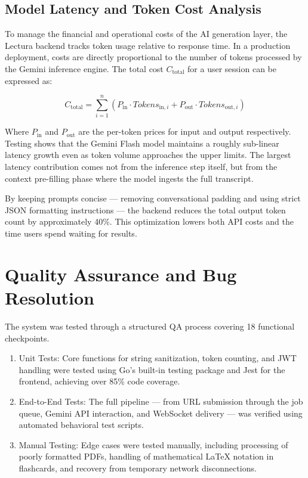 \subsection{Model Latency and Token Cost Analysis}
To manage the financial and operational costs of the AI generation layer, the Lectura backend tracks token usage relative to response time. In a production deployment, costs are directly proportional to the number of tokens processed by the Gemini inference engine. The total cost $C_{\text{total}}$ for a user session can be expressed as:

\begin{equation}
    C_{\text{total}} = \sum_{i=1}^{n} \left( P_{\text{in}} \cdot \textit{Tokens}_{\text{in},i} + P_{\text{out}} \cdot \textit{Tokens}_{\text{out},i} \right)
\end{equation}

Where $P_{\text{in}}$ and $P_{\text{out}}$ are the per-token prices for input and output respectively. Testing shows that the Gemini Flash model maintains a roughly sub-linear latency growth even as token volume approaches the upper limits. The largest latency contribution comes not from the inference step itself, but from the context pre-filling phase where the model ingests the full transcript.

By keeping prompts concise — removing conversational padding and using strict JSON formatting instructions — the backend reduces the total output token count by approximately 40\%. This optimization lowers both API costs and the time users spend waiting for results.

\section{Quality Assurance and Bug Resolution}
The system was tested through a structured QA process covering 18 functional checkpoints.

\begin{enumerate}
    \item Unit Tests: Core functions for string sanitization, token counting, and JWT handling were tested using Go's built-in testing package and Jest for the frontend, achieving over 85\% code coverage.
    \item End-to-End Tests: The full pipeline — from URL submission through the job queue, Gemini API interaction, and WebSocket delivery — was verified using automated behavioral test scripts.
    \item Manual Testing: Edge cases were tested manually, including processing of poorly formatted PDFs, handling of mathematical LaTeX notation in flashcards, and recovery from temporary network disconnections.
\end{enumerate}

